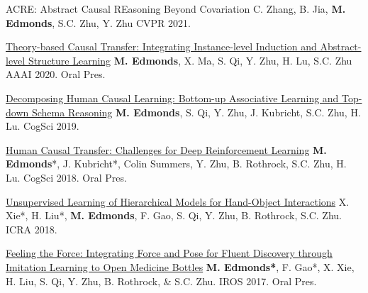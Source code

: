 


\begin{cvpublications}

\item \cvpublication
{ACRE: Abstract Causal REasoning Beyond Covariation} %
{C. Zhang, B. Jia, \textbf{M. Edmonds}, S.C. Zhu, Y. Zhu} %
{CVPR 2021.} %
{} %

\item \cvpublication
{\href{https://mjedmonds.com/papers/AAAI20_OpenLockLearnerTransferRL_final.pdf}{Theory-based Causal Transfer: Integrating Instance-level Induction and Abstract-level Structure Learning}} %
{\textbf{M. Edmonds}, X. Ma, S. Qi, Y. Zhu, H. Lu, S.C. Zhu} %
{AAAI 2020.} %
{Oral Pres.} %

 \item \cvpublication
{\href{http://www.mjedmonds.com/papers/CogSci19_OpenLockLearner_final.pdf}{Decomposing Human Causal Learning: Bottom-up Associative Learning and Top-down Schema Reasoning}} %
{\textbf{M. Edmonds}, S. Qi, Y. Zhu,  J. Kubricht, S.C. Zhu, H. Lu.} %
{CogSci 2019.} %
{} %

\item \cvpublication
{\href{http://www.mjedmonds.com/papers/CogSci18_OpenLock_CausalRL_final.pdf}{Human Causal Transfer: Challenges for Deep Reinforcement Learning}} %
{\textbf{M. Edmonds}*, J. Kubricht*, Colin Summers, Y. Zhu, B. Rothrock, S.C. Zhu, H. Lu.} %
{CogSci 2018.} %
{Oral Pres.} %

\item \cvpublication
{\href{http://www.mjedmonds.com/papers/ICRA18_Unsupervised_learning_hierarchical_hoi.pdf}{Unsupervised Learning of Hierarchical Models for Hand-Object Interactions}} %
{X. Xie*, H. Liu*, \textbf{M. Edmonds}, F. Gao, S. Qi, Y. Zhu, B. Rothrock, S.C. Zhu.} %
{ICRA 2018.} %
{} %

\item \cvpublication
{\href{http://www.mjedmonds.com/papers/IROS17_OpenBottle_final.pdf}{Feeling the Force: Integrating Force and Pose for Fluent Discovery through Imitation Learning to Open Medicine Bottles}} %
{\textbf{M. Edmonds*}, F. Gao*, X. Xie, H. Liu, S. Qi, Y. Zhu, B. Rothrock, \& S.C. Zhu.} %
{IROS 2017.} %
{Oral Pres.} %


\end{cvpublications}
